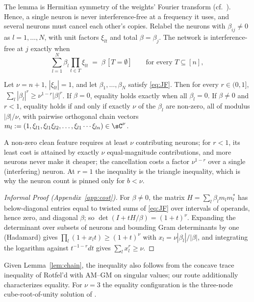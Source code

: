 The lemma is Hermitian symmetry of the weights' Fourier transform (cf.\ \citealp[Eq.~11]{gromov2023grokking}). Hence, a single neuron is never interference-free at a frequency it uses, and several neurons must cancel each other's copies. Relabel the neurons with $\beta_{ij}\neq0$ as $l=1,\dots,N$, with unit factors $\xi_{lt}$ and total $\beta=\beta_j$. The network is interference-free at $j$ exactly when
\begin{equation}
  \sum_{l=1}^N\beta_l\prod_{t\in T}\xi_{lt}\;=\;\beta\,[T=\emptyset]\qquad\text{for every }T\subseteq[n],
  \label{eq:JF}
\end{equation}

\begin{lemma}[]\label{lem:cost}
Let $\nu=n+1$, $|\xi_{lt}|=1$, and let $\beta_1,\dots,\beta_N$ satisfy \eqref{eq:JF}. Then for every $r\in(0,1]$, $\ \sum_l|\beta_l|^r\ge\nu^{1-r}|\beta|^r$. If $\beta=0$, equality holds exactly when all $\beta_l=0$. If $\beta\neq0$ and $r<1$, equality holds if and only if exactly $\nu$ of the $\beta_l$ are non-zero, all of modulus $|\beta|/\nu$, with pairwise orthogonal chain vectors $m_l:=(1,\xi_{l1},\xi_{l1}\xi_{l2},\dots,\xi_{l1}\cdots\xi_{ln})\in\sC^\nu$.
\end{lemma}

A non-zero clean feature requires at least $\nu$ contributing neurons; for $r<1$, its least cost is attained by exactly $\nu$ equal-magnitude contributions, and more neurons never make it cheaper; the cancellation costs a factor $\nu^{1-r}$ over a single (interfering) neuron. At $r=1$ the inequality is the triangle inequality, which is why the neuron count is pinned only for $b<\nu$.

\begin{proof}[Informal Proof (Appendix~\ref{app:cost})]
For $\beta\neq0$, the matrix $H=\sum_l\beta_lm_lm_l^*$ has below-diagonal entries equal to twisted sums of \eqref{eq:JF} over intervals of operands, hence zero, and diagonal $\beta$; so $\det(I+tH/\beta)=(1+t)^\nu$. Expanding the determinant over subsets of neurons and bounding Gram determinants by one (Hadamard) gives $\prod_l(1+x_lt)\ge(1+t)^\nu$ with $x_l=\nu|\beta_l|/|\beta|$, and integrating the logarithm against $t^{-1-r}dt$ gives $\sum_lx_l^r\ge\nu$.
\end{proof}
Given Lemma~\ref{lem:chain}, the inequality also follows from the concave trace inequality of Rotfel'd \citep{thompson1976convex} with AM--GM on singular values; our route additionally characterizes equality. For $\nu=3$ the equality configuration is the three-node cube-root-of-unity solution of \citet{tian2025composing}.

